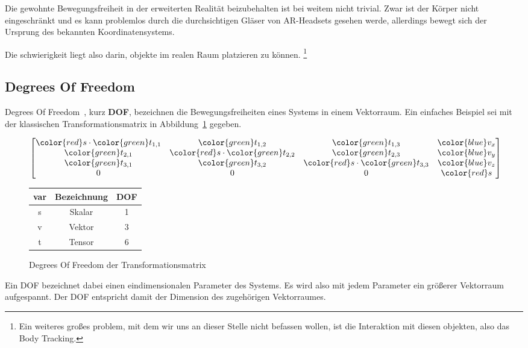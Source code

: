 Die gewohnte Bewegungsfreiheit in der erweiterten Realität beizubehalten ist bei weitem nicht trivial.
Zwar ist der Körper nicht eingeschränkt und es kann problemlos durch die durchsichtigen Gläser von AR-Headsets gesehen werde, allerdings bewegt sich der Ursprung des bekannten Koordinatensystems.

Die schwierigkeit liegt also darin, objekte im realen Raum platzieren zu können.
\footnote{Ein weiteres großes problem, mit dem wir uns an dieser Stelle nicht befassen wollen, ist die Interaktion mit diesen objekten, also das Body Tracking.}

\subsection{Degrees Of Freedom}\label{subsec:degrees-of-freedom}
Degrees Of Freedom~\autocite{wikipedia-contributors-2023B}, kurz \textbf{DOF}, bezeichnen die Bewegungsfreiheiten eines Systems in einem Vektorraum.
Ein einfaches Beispiel sei mit der klassischen Transformationsmatrix in Abbildung~\ref{fig:matrix-DOFs} gegeben.
\begin{figure}[ht!]
    \label{fig:matrix-DOFs}
    \begin{center}
        \begin{math}
            \begin{bmatrix}
            {\color{red} s}
                \cdot {\color{green} t_{1,1}} & {\color{green} t_{1,2}}                       & {\color{green} t_{1,3}}                       & {\color{blue} v_x} \\
                {\color{green} t_{2,1}}       & {\color{red} s} \cdot {\color{green} t_{2,2}} & {\color{green} t_{2,3}}                       & {\color{blue} v_y} \\
                {\color{green} t_{3,1}}       & {\color{green} t_{3,2}}                       & {\color{red} s} \cdot {\color{green} t_{3,3}} & {\color{blue} v_z} \\
                0                             & 0                                             & 0                                             & {\color{red} s}
            \end{bmatrix}
        \end{math}
    \end{center}
    \begin{tabular}{c|c|c}
        var             & Bezeichnung & DOF \\
        \hline
        \color{red} s   & Skalar      & 1   \\
        \color{blue} v  & Vektor      & 3   \\
        \color{green} t & Tensor      & 6   \\
    \end{tabular}
    \caption{Degrees Of Freedom der Transformationsmatrix}
\end{figure}
Ein DOF bezeichnet dabei einen eindimensionalen Parameter des Systems.
Es wird also mit jedem Parameter ein größerer Vektorraum aufgespannt.
Der DOF entspricht damit der Dimension des zugehörigen Vektorraumes.

